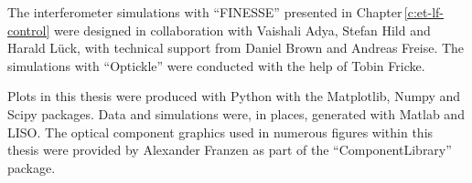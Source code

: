 The interferometer simulations with ``FINESSE'' presented in Chapter\,\ref{c:et-lf-control} were designed in collaboration with Vaishali Adya, Stefan Hild and Harald L\"{u}ck, with technical support from Daniel Brown and Andreas Freise. The simulations with ``Optickle'' were conducted with the help of Tobin Fricke.

Plots in this thesis were produced with Python with the Matplotlib, Numpy and Scipy packages. Data and simulations were, in places, generated with Matlab and LISO. The optical component graphics used in numerous figures within this thesis were provided by Alexander Franzen as part of the ``ComponentLibrary'' package.